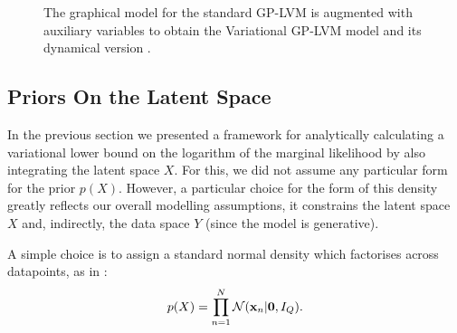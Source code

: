 \documentclass [10pt , a4paper]{article}
\begin{document}
\begin{figure}[ht]
\begin{center}
\hspace{0.1\textwidth}
\hspace{0.1\textwidth}
\end{center}
\vspace{-8pt}
\caption{ \small{
The graphical model for the standard GP-LVM  is augmented with auxiliary variables to obtain the
 Variational GP-LVM model  and its dynamical version }.}
\label{fig:graphicalModels}
\end{figure}



\subsection{\label{section:priors} Priors On the Latent Space}
In the previous section we presented a framework for analytically calculating a variational lower bound on the logarithm of
the marginal likelihood by also integrating the latent space $X$. For this, we did not assume any particular form for the
prior $p(X)$. However, a particular choice for the form of this density greatly reflects our overall modelling assumptions,
it constrains the latent space $X$ and, indirectly, the data space $Y$ (since the model is generative).
\par A simple choice is to assign a standard normal density which factorises across datapoints, as in \cite{BayesianGPLVM}:
\begin{equation}
\label{standardNormal}
p(X) = \prod_{n=1}^N \mathcal{N}(\mathbf{x}_n | \mathbf{0}, I_Q) .
\end{equation}
\end{document}
